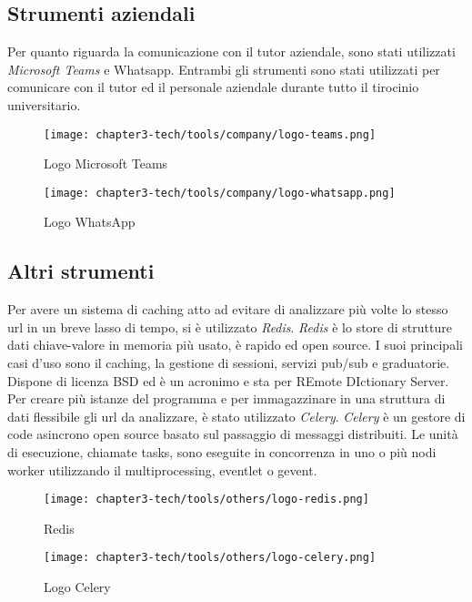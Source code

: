 \subsection{Strumenti aziendali}

Per quanto riguarda la comunicazione con il tutor aziendale, sono stati utilizzati \emph{Microsoft Teams} e Whatsapp. Entrambi gli strumenti sono stati utilizzati per comunicare con il tutor ed il personale aziendale durante tutto il tirocinio universitario.

\begin{figure}[!h]
    \begin{minipage}{.5\textwidth} 
        \centering 
        \texttt{[image: chapter3-tech/tools/company/logo-teams.png]} 
        \caption{Logo Microsoft Teams} 
        \label{fig:teams} 
    \end{minipage}%
    \begin{minipage}{.5\textwidth} 
        \centering 
        \texttt{[image: chapter3-tech/tools/company/logo-whatsapp.png]} 
        \caption{Logo WhatsApp} 
        \label{fig:whatsapp} 
    \end{minipage}  
\end{figure}

\subsection{Altri strumenti}

Per avere un sistema di caching atto ad evitare di analizzare più volte lo stesso url in un breve lasso di tempo, si è utilizzato \emph{Redis}. \emph{Redis} è lo store di strutture dati chiave-valore in memoria più usato, è rapido ed open source. I suoi principali casi d'uso sono il caching, la gestione di sessioni, servizi pub/sub e graduatorie. Dispone di licenza BSD ed è un acronimo e sta per REmote DIctionary Server.
Per creare più istanze del programma e per immagazzinare in una struttura di dati flessibile gli url da analizzare, è stato utilizzato \emph{Celery}. \emph{Celery} è un gestore di code asincrono open source basato sul passaggio di messaggi distribuiti. Le unità di esecuzione, chiamate tasks, sono eseguite in concorrenza in uno o più nodi worker utilizzando il multiprocessing, eventlet o gevent.
\begin{figure}[!h]
    \begin{minipage}{.5\textwidth} 
        \centering 
        \texttt{[image: chapter3-tech/tools/others/logo-redis.png]} 
        \caption{Redis} 
        \label{fig:redis} 
    \end{minipage}%
    \begin{minipage}{.5\textwidth} 
        \centering 
        \texttt{[image: chapter3-tech/tools/others/logo-celery.png]} 
        \caption{Logo Celery} 
        \label{fig:celery} 
    \end{minipage}%
\end{figure}

